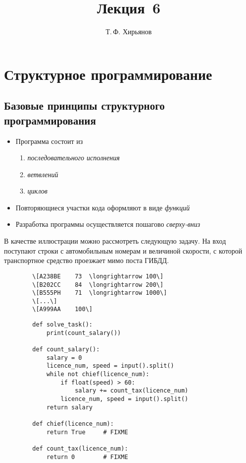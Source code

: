 \documentclass[a4paper, fleqn]{article}
\title{Лекция \textnumero\,6}
\author{Т.\,Ф. Хирьянов}
\date{}
\begin{document}
	\maketitle
	
	\section*{Структурное программирование}
	
	
	\subsection*{Базовые принципы структурного программирования}
	
	\begin{itemize}
		\item Программа состоит из 
		\begin{enumerate}
			\item \emph{последовательного исполнения}
			\item \emph{ветвлений}
			\item \emph{циклов}
		\end{enumerate}
		\item Повторяющиеся участки кода оформляют в виде \emph{функций}
		\item Разработка программы осуществляется пошагово \emph{сверху-вниз}
	\end{itemize}
	
	В качестве иллюстрации можно рассмотреть следующую задачу. На вход поступают строки с автомобильным номерам и величиной скорости, с которой транспортное средство проезжает мимо поста ГИБДД. 
	
	\begin{lstlisting}
		\[A238BE	73	\longrightarrow 100\]
		\[B202CC	84	\longrightarrow	200\]
		\[B555PH	71	\longrightarrow	1000\]
		\[...\]
		\[A999AA	100\]	
	\end{lstlisting}
	
	\begin{lstlisting}
		def solve_task():
			print(count_salary())
			
		def count_salary():
			salary = 0
			licence_num, speed = input().split()
			while not chief(licence_num):
				if float(speed) > 60:
					salary += count_tax(licence_num)
				licence_num, speed = input().split()
			return salary
			
		def chief(licence_num):
			return True		# FIXME
			
		def count_tax(licence_num):
			return 0		# FIXME
				
	\end{lstlisting}
	
\end{document}
